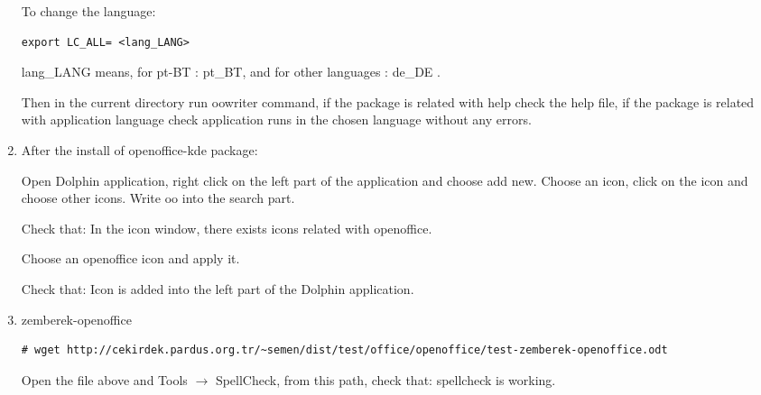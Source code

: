 \documentclass[a4paper,10pt]{article}
\begin{document}
\begin{enumerate}
\begin{verbatim}
\end{verbatim}

To change the language:
\begin{verbatim}
export LC_ALL= <lang_LANG>
\end{verbatim}

lang\_LANG means, for pt-BT : pt\_BT, and for other languages : de\_DE .

Then in the current directory run oowriter command, if the package is related with help check the help file, if the package is related with application language check application runs in the chosen language without any errors.


\item After the install of openoffice-kde package:

Open Dolphin application, right click on the left part of the application and choose add new. Choose an icon, click on the icon and choose other icons. Write oo into the search part.

Check that: In the icon window, there exists icons related with openoffice.

Choose an openoffice icon and apply it.

Check that: Icon is added into the left part of the Dolphin application.

\item zemberek-openoffice

\begin{verbatim}
# wget http://cekirdek.pardus.org.tr/~semen/dist/test/office/openoffice/test-zemberek-openoffice.odt
\end{verbatim}

Open the file above and Tools $\rightarrow$ SpellCheck, from this path, check that: spellcheck is working.
\end{enumerate}
\end{document}
